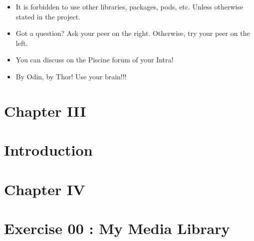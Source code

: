 \documentclass[12pt]{report}
\begin{document}
\begin{itemize}
	\item It is forbidden to use other libraries, packages, pods, etc. Unless otherwise stated in the project.\par

	\item Got a question? Ask your peer on the right. Otherwise, try your peer on the left.\par

	\item You can discuss on the Piscine forum of your Intra!\par

	\item By Odin, by Thor! Use your brain!!!
\end{itemize}\par


\vspace{\baselineskip}

\vspace{\baselineskip}



\newpage

\vspace{\baselineskip}
\vspace{\baselineskip}
\section*{Chapter III}
\section*{Introduction}

\vspace{\baselineskip}

\vspace{\baselineskip}



\newpage

\vspace{\baselineskip}
\vspace{\baselineskip}
\section*{Chapter IV}
\section*{Exercise 00 : My Media Library}
\end{document}
